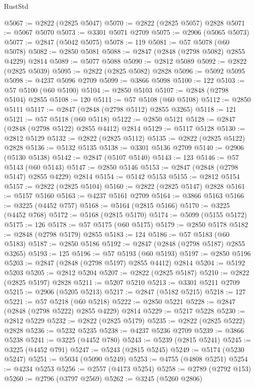 \begin{lexlean}{RustStd}
\begin{coremodule}
@5067 := @2822 (@2825 @5047)
@5070 := @2822 (@2825 @5057) @2828
@5071 := @5067 @5070
@5073 := @3301 @5071 @2709
@5075 := @2906 (@5065 @5073)
@5077 := @2847 (@5042 @5075)
@5078 := 119
@5081 := @57 @5078 (@60 @5078)
@5082 := @2850 @5081
@5088 := @2847 (@2848 (@2798 @5082) @2855 @4229) @2814
@5089 := @5077 @5088
@5090 := @2812 @5089
@5092 := @2822 (@2825 @5039)
@5095 := @2822 (@2825 @5082) @2828
@5096 := @5092 @5095
@5098 := @4237 @5096 @2709
@5099 := @3866 @5098
@5100 := 122
@5103 := @57 @5100 (@60 @5100)
@5104 := @2850 @5103
@5107 := @2848 (@2798 @5104) @2855
@5108 := 120
@5111 := @57 @5108 (@60 @5108)
@5112 := @2850 @5111
@5117 := @2847 (@2848 (@2798 @5112) @2855 @3265)
@5118 := 121
@5121 := @57 @5118 (@60 @5118)
@5122 := @2850 @5121
@5128 := @2847 (@2848 (@2798 @5122) @2855 @4412) @2814
@5129 := @5117 @5128
@5130 := @2812 @5129
@5132 := @2822 (@2825 @5112)
@5135 := @2822 (@2825 @5122) @2828
@5136 := @5132 @5135
@5138 := @3301 @5136 @2709
@5140 := @2906 (@5130 @5138)
@5142 := @2847 (@5107 @5140)
@5143 := 123
@5146 := @57 @5143 (@60 @5143)
@5147 := @2850 @5146
@5153 := @2847 (@2848 (@2798 @5147) @2855 @4229) @2814
@5154 := @5142 @5153
@5155 := @2812 @5154
@5157 := @2822 (@2825 @5104)
@5160 := @2822 (@2825 @5147) @2828
@5161 := @5157 @5160
@5163 := @4237 @5161 @2709
@5164 := @3866 @5163
@5166 := @3225 (@4452 @757)
@5168 := @5164 (@2815 @5166)
@5170 := @3225 (@4452 @768)
@5172 := @5168 (@2815 @5170)
@5174 := @5099 (@5155 @5172)
@5175 := 126
@5178 := @57 @5175 (@60 @5175)
@5179 := @2850 @5178
@5182 := @2848 (@2798 @5179) @2855
@5183 := 124
@5186 := @57 @5183 (@60 @5183)
@5187 := @2850 @5186
@5192 := @2847 (@2848 (@2798 @5187) @2855 @3265)
@5193 := 125
@5196 := @57 @5193 (@60 @5193)
@5197 := @2850 @5196
@5203 := @2847 (@2848 (@2798 @5197) @2855 @4412) @2814
@5204 := @5192 @5203
@5205 := @2812 @5204
@5207 := @2822 (@2825 @5187)
@5210 := @2822 (@2825 @5197) @2828
@5211 := @5207 @5210
@5213 := @3301 @5211 @2709
@5215 := @2906 (@5205 @5213)
@5217 := @2847 (@5182 @5215)
@5218 := 127
@5221 := @57 @5218 (@60 @5218)
@5222 := @2850 @5221
@5228 := @2847 (@2848 (@2798 @5222) @2855 @4229) @2814
@5229 := @5217 @5228
@5230 := @2812 @5229
@5232 := @2822 (@2825 @5179)
@5235 := @2822 (@2825 @5222) @2828
@5236 := @5232 @5235
@5238 := @4237 @5236 @2709
@5239 := @3866 @5238
@5241 := @3225 (@4452 @780)
@5243 := @5239 (@2815 @5241)
@5245 := @3225 (@4452 @791)
@5247 := @5243 (@2815 @5245)
@5249 := @5174 (@5230 @5247)
@5251 := @5034 (@5090 @5249)
@5253 := @4755 (@4808 @5251)
@5254 := @4234 @5253
@5256 := @2557 (@4173 @5254)
@5258 := @2789 (@2792 @153)
@5260 := @2796 (@3797 @2569)
@5262 := @3245 (@5260 @2806)

\end{coremodule}
\end{lexlean}
